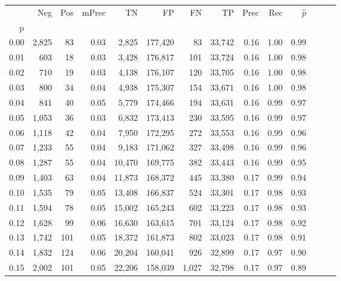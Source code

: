 \begin{tabular}{rrrrrrrrrrrrrr}
\toprule
{} &    Neg &  Pos & mPrec &       TN &       FP &      FN &      TP &  Prec &   Rec & $\hat{p}$ \\
p    &        &      &       &          &          &         &         &       &       &           \\
\midrule
0.00 &  2,825 &   83 &  0.03 &    2,825 &  177,420 &      83 &  33,742 &  0.16 &  1.00 &      0.99 \\
0.01 &    603 &   18 &  0.03 &    3,428 &  176,817 &     101 &  33,724 &  0.16 &  1.00 &      0.98 \\
0.02 &    710 &   19 &  0.03 &    4,138 &  176,107 &     120 &  33,705 &  0.16 &  1.00 &      0.98 \\
0.03 &    800 &   34 &  0.04 &    4,938 &  175,307 &     154 &  33,671 &  0.16 &  1.00 &      0.98 \\
0.04 &    841 &   40 &  0.05 &    5,779 &  174,466 &     194 &  33,631 &  0.16 &  0.99 &      0.97 \\
0.05 &  1,053 &   36 &  0.03 &    6,832 &  173,413 &     230 &  33,595 &  0.16 &  0.99 &      0.97 \\
0.06 &  1,118 &   42 &  0.04 &    7,950 &  172,295 &     272 &  33,553 &  0.16 &  0.99 &      0.96 \\
0.07 &  1,233 &   55 &  0.04 &    9,183 &  171,062 &     327 &  33,498 &  0.16 &  0.99 &      0.96 \\
0.08 &  1,287 &   55 &  0.04 &   10,470 &  169,775 &     382 &  33,443 &  0.16 &  0.99 &      0.95 \\
0.09 &  1,403 &   63 &  0.04 &   11,873 &  168,372 &     445 &  33,380 &  0.17 &  0.99 &      0.94 \\
0.10 &  1,535 &   79 &  0.05 &   13,408 &  166,837 &     524 &  33,301 &  0.17 &  0.98 &      0.93 \\
0.11 &  1,594 &   78 &  0.05 &   15,002 &  165,243 &     602 &  33,223 &  0.17 &  0.98 &      0.93 \\
0.12 &  1,628 &   99 &  0.06 &   16,630 &  163,615 &     701 &  33,124 &  0.17 &  0.98 &      0.92 \\
0.13 &  1,742 &  101 &  0.05 &   18,372 &  161,873 &     802 &  33,023 &  0.17 &  0.98 &      0.91 \\
0.14 &  1,832 &  124 &  0.06 &   20,204 &  160,041 &     926 &  32,899 &  0.17 &  0.97 &      0.90 \\
0.15 &  2,002 &  101 &  0.05 &   22,206 &  158,039 &   1,027 &  32,798 &  0.17 &  0.97 &      0.89 \\

\end{tabular}
